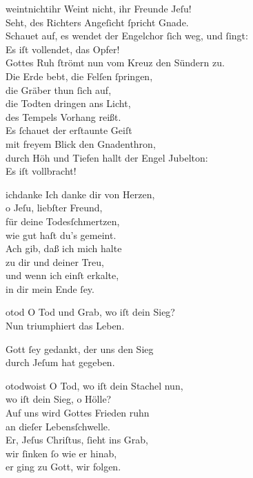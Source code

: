\documentclass[shorttitlesize=55,tocstyle=ref-genre]{ees}
\begin{document}
{\begin{movement}{weintnichtihr}
  \voice[Basso]
  Weint nicht, ihr Freunde Jeſu!\\
  Seht, des Richters Angeſicht ſpricht Gnade.\\
  Schauet auf, es wendet der Engelchor ſich weg, und ſingt:\\
  Es iſt vollendet, das Opfer!\\
  Gottes Ruh ſtrömt nun vom Kreuz den Sündern zu.\\
  Die Erde bebt, die Felſen ſpringen,\\
  die Gräber thun ſich auf,\\
  die Todten dringen ans Licht,\\
  des Tempels Vorhang reißt.\\
  Es ſchauet der erſtaunte Geiſt\\
  mit freyem Blick den Gnadenthron,\\
  durch Höh und Tiefen hallt der Engel Jubelton:\\
  Es iſt vollbracht!
\end{movement}

\begin{movement}{ichdanke}
  \voice[Coro]
  Ich danke dir von Herzen,\\
  o Jeſu, liebſter Freund,\\
  für deine Todesſchmertzen,\\
  wie gut haſt du’s gemeint.\\
  Ach gib, daß ich mich halte\\
  zu dir und deiner Treu,\\
  und wenn ich einſt erkalte,\\
  in dir mein Ende ſey.
\end{movement}

\begin{movement}{otod}
  \voice[Basso]
  O Tod und Grab, wo iſt dein Sieg?\\
  Nun triumphiert das Leben.

  \voice[Coro]
  Gott ſey gedankt, der uns den Sieg\\
  durch Jeſum hat gegeben.
\end{movement}

\begin{movement}{otodwoist}
  \voice[Coro]
  O Tod, wo iſt dein Stachel nun,\\
  wo iſt dein Sieg, o Hölle?\\
  Auf uns wird Gottes Frieden ruhn\\
  an dieſer Lebensſchwelle.\\
  Er, Jeſus Chriſtus, ſieht ins Grab,\\
  wir ſinken ſo wie er hinab,\\
  er ging zu Gott, wir folgen.
\end{movement}

}
\end{document}
